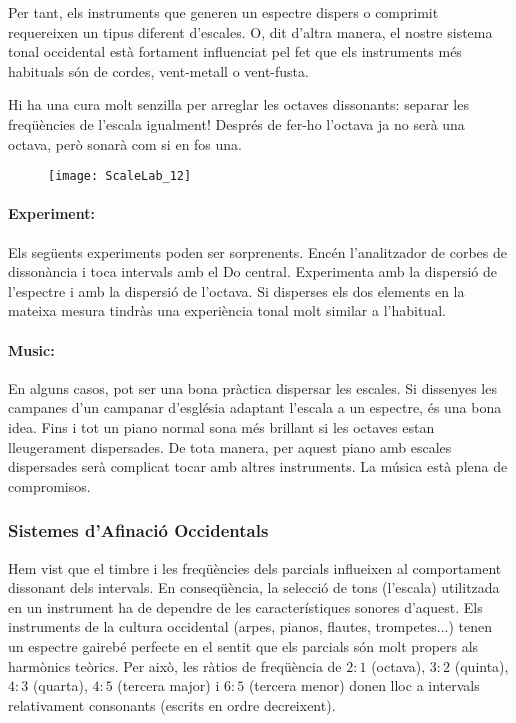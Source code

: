 Per tant, els instruments que generen un espectre dispers o comprimit requereixen un tipus diferent d'escales. O, dit d'altra manera, el nostre sistema tonal occidental està fortament influenciat pel fet que els instruments més habituals són de cordes, vent-metall o vent-fusta.

Hi ha una cura molt senzilla per arreglar les octaves dissonants: separar les freqüències de l'escala igualment! Després de fer-ho l'octava ja no serà una octava, però sonarà com si en fos una.

\begin{figure}[h]
\centering
\texttt{[image: ScaleLab\_12]}
\end{figure}

\paragraph{Experiment:}
Els següents experiments poden ser sorprenents. Encén l'analitzador de corbes de dissonància i toca intervals amb el Do central. Experimenta amb la dispersió de l'espectre i amb la dispersió de l'octava. Si disperses els dos elements en la mateixa mesura tindràs una experiència tonal molt similar a l'habitual.

\paragraph{Music:}
En alguns casos, pot ser una bona pràctica dispersar les escales. Si dissenyes les campanes d'un campanar d'església adaptant l'escala a un espectre, és una bona idea. Fins i tot un piano normal sona més brillant si les octaves estan lleugerament dispersades. De tota manera, per aquest piano amb escales dispersades serà complicat tocar amb altres instruments. La música està plena de compromisos.

\subsubsection{Sistemes d'Afinació Occidentals}
Hem vist que el timbre i les freqüències dels parcials influeixen al comportament dissonant dels intervals. En conseqüència, la selecció de tons (l'escala) utilitzada en un instrument ha de dependre de les característiques sonores d'aquest. Els instruments de la cultura occidental (arpes, pianos, flautes, trompetes...) tenen un espectre gairebé perfecte en el sentit que els parcials són molt propers als harmònics teòrics. Per això, les ràtios de freqüència de $2 : 1$ (octava), $3 : 2$ (quinta), $4 : 3$ (quarta), $4 : 5$ (tercera major) i $6 : 5$ (tercera menor) donen lloc a intervals relativament consonants (escrits en ordre decreixent).

